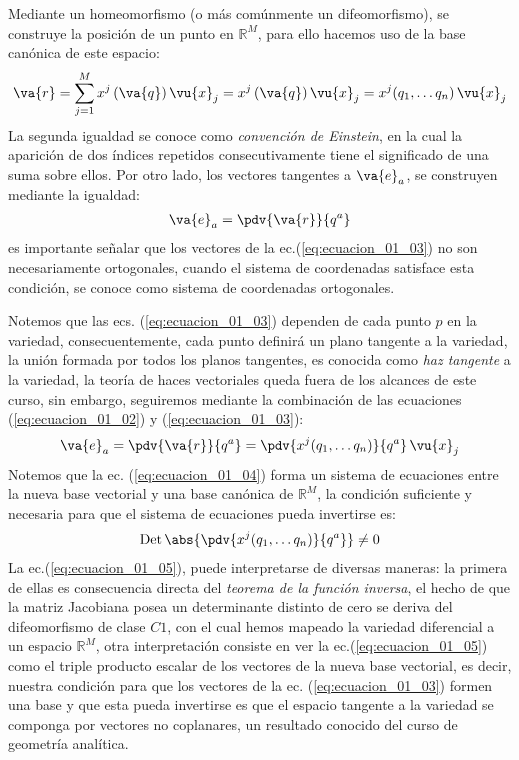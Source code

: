 Mediante un homeomorfismo (o más comúnmente un difeomorfismo), se construye la posición de un punto en $\mathbb{R}^{M}$, para ello hacemos uso de la base canónica de este espacio:
\begin{align}
\va{r} = \sum_{j=1}^{M} x^{j} \, (\va{q}) \, \vu{x}_{j} = x^{j} \, (\va{q}) \, \vu{x}_{j} = x^{j} (q_{1}, \ldots q_{n}) \, \vu{x}_{j}
\label{eq:ecuacion_01_02}
\end{align}
La segunda igualdad se conoce como \emph{convención de Einstein}, en la cual la aparición de dos índices repetidos consecutivamente tiene el significado de una suma sobre ellos. Por otro lado, los vectores tangentes a $\va{e}_{a}$, se construyen mediante la igualdad:
\begin{align}
\va{e}_{a} = \pdv{\va{r}}{q^{a}}
\label{eq:ecuacion_01_03}
\end{align}
es importante señalar que los vectores de la ec.(\ref{eq:ecuacion_01_03}) no son necesariamente ortogonales, cuando el sistema de coordenadas satisface esta condición, se conoce como sistema de coordenadas ortogonales.
\par
Notemos que las ecs. (\ref{eq:ecuacion_01_03}) dependen de cada punto $p$ en la variedad, consecuentemente, cada punto definirá un plano tangente a la variedad, la unión formada por todos los planos tangentes, es conocida como \emph{haz tangente} a la variedad, la teoría de haces vectoriales queda fuera de los alcances de este curso, sin embargo, seguiremos mediante la combinación de las ecuaciones (\ref{eq:ecuacion_01_02}) y (\ref{eq:ecuacion_01_03}):
\begin{align}
\va{e}_{a} = \pdv{\va{r}}{q^{a}} = \pdv{x^{j} (q_{1}, \ldots q_{n})}{q^{a}} \, \vu{x}_{j}
\label{eq:ecuacion_01_04}
\end{align}
Notemos que la ec. (\ref{eq:ecuacion_01_04}) forma un sistema de ecuaciones entre la nueva base vectorial y una base canónica de $\mathbb{R}^{M}$, la condición suficiente y necesaria para que el sistema de ecuaciones pueda invertirse es:
\begin{align}
{\rm Det} \, \abs{\pdv{x^{j} (q_{1}, \ldots q_{n})}{q^{a}}} \neq 0
\label{eq:ecuacion_01_05}
\end{align}
La ec.(\ref{eq:ecuacion_01_05}), puede interpretarse de diversas maneras: la primera de ellas es consecuencia directa del \emph{teorema de la función inversa}, el hecho de que la matriz Jacobiana posea un determinante distinto de cero se deriva del difeomorfismo de clase $C1$, con el cual hemos mapeado la variedad diferencial a un espacio $\mathbb{R}^{M}$, otra interpretación consiste en ver la ec.(\ref{eq:ecuacion_01_05}) como el triple producto escalar de los vectores de la nueva base vectorial, es decir, nuestra condición para que los vectores de la ec. (\ref{eq:ecuacion_01_03})  formen una base y que esta pueda invertirse es que el espacio tangente a la variedad se componga por vectores no coplanares, un resultado conocido del curso de geometría analítica.
